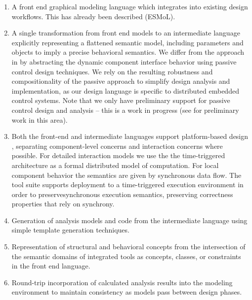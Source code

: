 \begin{enumerate}

\item A front end graphical modeling language which integrates into existing 
design workflows\cite{modeling:esmol}.  This has already been described (ESMoL).

\item A single transformation from front end models to an intermediate language explicitly 
representing a flattened semantic model, including parameters and objects to imply a precise 
behavioral semantics.  We differ from the approach in \cite{modeling:hybrid_abs} by abstracting the 
dynamic component interface behavior using passive control design 
techniques. We rely on the resulting robustness and compositionality of the passive approach 
to simplify design analysis and implementation, as our design language is
specific to distributed embedded control systems.  Note that we only have preliminary 
support for passive control design and analysis -- this is a work in progress (see \cite{ncs:mic} 
for preliminary work in this area).

\item Both the front-end and intermediate languages support platform-based design \cite{modeling:platform}, 
separating component-level concerns and interaction concerns where possible.  For detailed interaction models we use the the time-triggered 
architecture\cite{timed:tta} as a formal distributed model of computation. For
local component behavior the semantics are given by synchronous data flow. The 
tool suite supports deployment
to a time-triggered execution environment\cite{timed:frodo} in order to preservesynchronous execution semantics, preserving correctness properties that rely
on synchrony.

\item Generation of analysis models and code from the intermediate language
using simple template generation techniques\cite{sched:analysis}.

\item Representation of structural and behavioral concepts from the 
intersection of the semantic domains of integrated tools as concepts, classes,
or constraints in the front end language.

\item Round-trip incorporation of calculated analysis results into the modeling environment to 
maintain consistency as models pass between design phases.

\end{enumerate}

